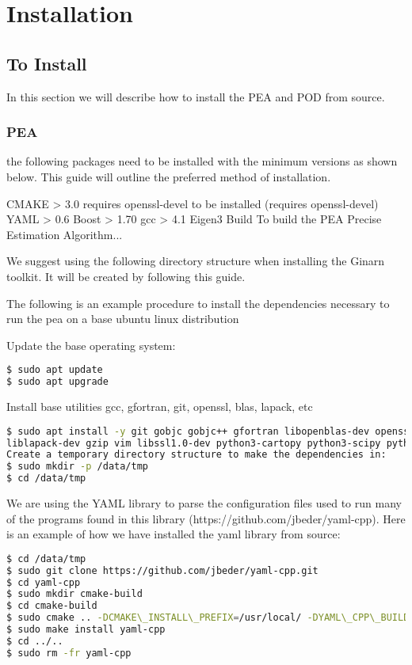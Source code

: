 \chapter{Installation}
\label{ch:installation}


\section{To Install} 

In this section we will describe how to install the PEA and POD from source.

\subsection{PEA}


 the following packages need to be installed with the minimum versions as shown below. This guide will outline the preferred method of installation.

CMAKE  > 3.0 requires openssl-devel to be installed (requires openssl-devel)
YAML   > 0.6
Boost  > 1.70
gcc    > 4.1
Eigen3
Build
To build the PEA Precise Estimation Algorithm...

We suggest using the following directory structure when installing the Ginarn toolkit. It will be created by following this guide.


The following is an example procedure to install the dependencies necessary to run the pea on a base ubuntu linux distribution

Update the base operating system:
\begin{lstlisting}[language=bash]
$ sudo apt update
$ sudo apt upgrade
\end{lstlisting}
Install base utilities gcc, gfortran, git, openssl, blas, lapack, etc
\begin{lstlisting}[language=bash]
$ sudo apt install -y git gobjc gobjc++ gfortran libopenblas-dev openssl curl net-tools openssh-server cmake make \
liblapack-dev gzip vim libssl1.0-dev python3-cartopy python3-scipy python3-matplotlib python3-mpltoolkits.basemap
Create a temporary directory structure to make the dependencies in:
$ sudo mkdir -p /data/tmp
$ cd /data/tmp
\end{lstlisting}

We are using the YAML library to parse the configuration files used to run many of the programs found in this library (https://github.com/jbeder/yaml-cpp). Here is an example of how we have installed the yaml library from source:
\begin{lstlisting}[language=bash]
$ cd /data/tmp
$ sudo git clone https://github.com/jbeder/yaml-cpp.git
$ cd yaml-cpp
$ sudo mkdir cmake-build
$ cd cmake-build
$ sudo cmake .. -DCMAKE\_INSTALL\_PREFIX=/usr/local/ -DYAML\_CPP\_BUILD\_TESTS=OFF
$ sudo make install yaml-cpp
$ cd ../..
$ sudo rm -fr yaml-cpp
\end{lstlisting}

